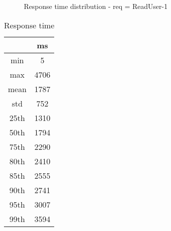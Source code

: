 \begin{minipage}{0.75\linewidth}
\begin{figure}[h]
\begin{adjustbox}{max width=1.0\linewidth, keepaspectratio}
  \end{adjustbox}
  \caption{Response time distribution - req = ReadUser-1}
\end{figure}
\end{minipage}\hfill\begin{minipage}{0.18\linewidth}
\begin{table}[h]
\begin{tabular}{|cc|}
\hline
\textbf{} & \textbf{ms}\\ \hline
 \Xhline{0.005\arrayrulewidth}
min & 5\\
 \Xhline{0.005\arrayrulewidth}
max & 4706\\
 \Xhline{0.005\arrayrulewidth}
mean & 1787\\
 \Xhline{0.005\arrayrulewidth}
std & 752\\
\hline
\hline
 \Xhline{0.005\arrayrulewidth}
25th & 1310\\
 \Xhline{0.005\arrayrulewidth}
50th & 1794\\
 \Xhline{0.005\arrayrulewidth}
75th & 2290\\
 \Xhline{0.005\arrayrulewidth}
80th & 2410\\
 \Xhline{0.005\arrayrulewidth}
85th & 2555\\
 \Xhline{0.005\arrayrulewidth}
90th & 2741\\
 \Xhline{0.005\arrayrulewidth}
95th & 3007\\
 \Xhline{0.005\arrayrulewidth}
99th & 3594\\
\hline
\end{tabular}
\caption{Response time}
\end{table}
\end{minipage}\hfill